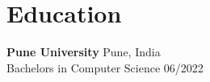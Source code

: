 \section*{Education}
\textbf{Pune University} \hfill Pune, India \\
Bachelors in Computer Science \hfill 06/2022
